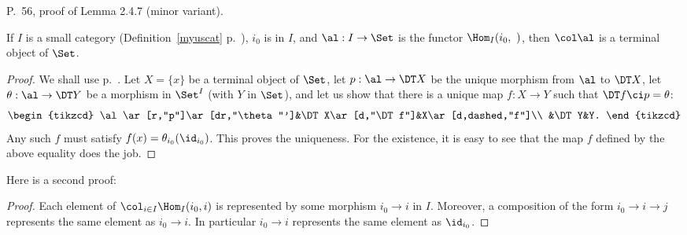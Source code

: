 \documentclass[12pt]{article}
\theoremstyle{remark}
\theoremstyle{definition}
\begin{document}



\begin{s} 
P.~56, proof of Lemma 2.4.7 (minor variant).

\begin{lem} 
If $I$ is a small category (Definition~\ref{myuscat} p.~), $i_0$ is in $I$, and $\al:I\to\Set$ is the functor $\Hom_I(i_0,\ )$, then $\col\al$ is a terminal object of $\Set$. 
\end{lem}

\begin{proof}
We shall use  p.~. Let $X=\{x\}$ be a terminal object of $\Set$, let $p:\al\to\DT X$ be the unique morphism from $\al$ to $\DT X$, let $\theta:\al\to\DT Y$ be a morphism in $\Set^I$ (with $Y$ in $\Set$), and let us show that there is a unique map $f:X\to Y$ such that $\DT f\ci p=\theta$: 
$$
\begin{tikzcd}
\al\ar[r,"p"]\ar[dr,"\theta"']&\DT X\ar[d,"\DT f"]&X\ar[d,dashed,"f"]\\ 
&\DT Y&Y.
\end{tikzcd}
$$ 
Any such $f$ must satisfy $f(x)=\theta_{i_0}(\id_{i_0})$. This proves the uniqueness. For the existence, it is easy to see that the map $f$ defined by the above equality does the job.
\end{proof}

Here is a second proof:

\begin{proof}
Each element of $\col_{i\in I}\Hom_I(i_0,i)$ is represented by some morphism $i_0\to i$ in $I$. Moreover, a composition of the form $i_0\to i\to j$ represents the same element as 
$i_0\to i$. In particular $i_0\to i$ represents the same element as $\id_{i_0}$. 
\end{proof}
\end{s}

%
\end{document}
